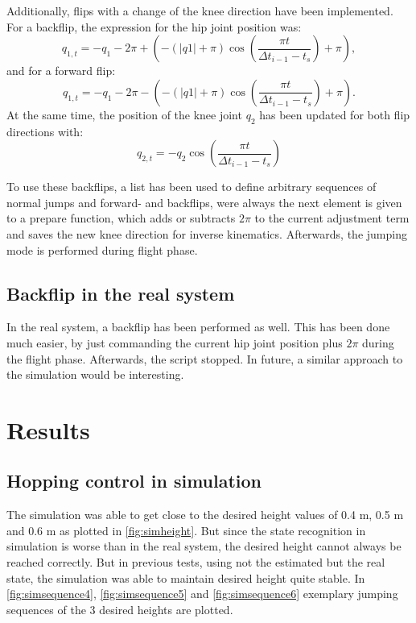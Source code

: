 \documentclass[onecolumn, letter paper]{report}
\begin{document}
Additionally, flips with a change of the knee direction have been implemented. For a backflip, the expression for the hip joint position was:
\begin{equation}
    q_{1,t} = -q_1 - 2 \pi + (-(|q1| + \pi) \cos(\frac{\pi t}{\Delta t_{i-1} - t_s}) + \pi),
\end{equation}
and for a forward flip:
\begin{equation}
    q_{1,t} = -q_1 - 2 \pi - (-(|q1| + \pi) \cos(\frac{\pi t}{\Delta t_{i-1} - t_s}) + \pi).
\end{equation}
At the same time, the position of the knee joint $q_2$ has been updated for both flip directions with:
\begin{equation}
    q_{2,t} = - q_2 \cos(\frac{\pi t}{\Delta t_{i-1} - t_s})
\end{equation}


To use these backflips, a list has been used to define arbitrary sequences of normal jumps and forward- and backflips, were always the next element is given to a prepare function, which adds or subtracts $2 \pi$ to the current adjustment term and saves the new knee direction for inverse kinematics. Afterwards, the jumping mode is performed during flight phase.   

\section{Backflip in the real system}
In the real system, a backflip has been performed as well. This has been done much easier, by just commanding the current hip joint position plus $2 \pi$ during the flight phase. Afterwards, the script stopped.
In future, a similar approach to the simulation would be interesting.
\chapter{Results}


\section{Hopping control in simulation}
The simulation was able to get close to the desired height values of 0.4 m, 0.5 m and 0.6 m as plotted in \autoref{fig:simheight}.
But since the state recognition in simulation is worse than in the real system, the desired height cannot always be reached correctly. But in previous tests, using not the estimated but the real state, the simulation was able to maintain desired height quite stable.
In \autoref{fig:simsequence4}, \ref{fig:simsequence5} and \ref{fig:simsequence6} exemplary jumping sequences of the 3 desired heights are plotted.
\end{document}
